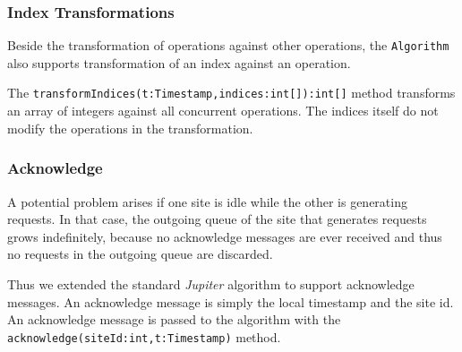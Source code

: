 \subsubsection{Index Transformations}
Beside the transformation of operations against other operations, the
\texttt{Algorithm} also supports transformation of an index against an
operation. 

The \texttt{transformIndices(t:Timestamp,indices:int[]):int[]} method transforms
an array of integers against all concurrent operations. The indices itself
do not modify the operations in the transformation.

\subsubsection{Acknowledge}
A potential problem arises if one site is idle while the other is generating
requests. In that case, the outgoing queue of the site that generates requests
grows indefinitely, because no acknowledge messages are ever received and thus
no requests in the outgoing queue are discarded.

Thus we extended the standard \emph{Jupiter} algorithm to support acknowledge
messages. An acknowledge message is simply the local timestamp and the site
id. An acknowledge message is passed to the algorithm with the
\texttt{acknowledge(siteId:int,t:Timestamp)} method.




